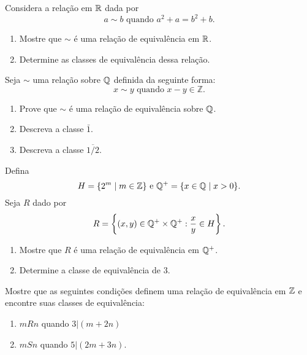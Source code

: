 \documentclass[12pt]{exam}
\begin{document}
    \questao{} Considera a rela\c{c}\~ao em $\mathbb{R}$ dada por
    \[
        a \sim b \mbox{ quando } a^2 + a = b^2 + b.
    \]
    \begin{enumerate}[label={\alph*})]
        \item Mostre que $\sim$ \'e uma rela\c{c}\~ao de equival\^encia em $\mathbb{R}$.

        \item Determine as classes de equival\^encia dessa rela\c{c}\~ao.
    \end{enumerate}

    \vspace{.3cm}

    \questao{} Seja $\sim$ uma rela{\c c}{\~a}o sobre $\mathbb{Q}$ definida da seguinte forma:
    \[
        x \sim y \mbox{ quando } x - y \in \mathbb{Z}.
    \]
    \begin{enumerate}[label={\alph*})]
        \item Prove que $\sim$ {\'e} uma rela{\c c}{\~a}o de equival{\^e}ncia sobre $\mathbb{Q}$.

        \item Descreva a classe $\bar{1}$.

        \item Descreva a classe $\overline{1/2}$.
    \end{enumerate}

    \vspace{.3cm}

    \questao{} Defina
    \[
        H = \{2^m \mid m \in \mathbb{Z}\} \mbox{ e } \mathbb{Q}^+ = \{x \in \mathbb{Q} \mid x > 0\}.
    \]
    Seja $R$ dado por
    \[
        R = \left\{(x,y) \in \mathbb{Q}^+\times \mathbb{Q}^+ : \frac{x}{y} \in H\right\}.
    \]
    \begin{enumerate}[label={\alph*})]
        \item Mostre que $R$ \'e uma rela\c{c}\~ao de equival\^encia em $\mathbb{Q}^+$.

        \item Determine a classe de equival\^encia de $3$.
    \end{enumerate}

    \vspace{.3cm}

    \questao{} Mostre que as seguintes condições definem uma relação de equivalência em $\mathbb{Z}$ e encontre suas classes de equivalência:
    \begin{enumerate}[label={\alph*})]
        \item $mRn$ quando $3 | (m + 2n)$

        \item $mSn$ quando $5 | (2m + 3n)$.
    \end{enumerate}
\end{document}

